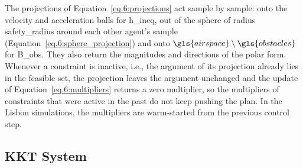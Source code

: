 The projections of Equation~\eqref{eq.6:projections} act sample by sample: onto the velocity and acceleration balls for \gls{h_ineq}, out of the sphere of radius \gls{safety_radius} around each other agent's sample (Equation~\eqref{eq.6:sphere_projection}) and onto $\gls{airspace}\setminus\gls{obstacles}$ for \gls{B_obs}. They also return the magnitudes and directions of the polar form. Whenever a constraint is inactive, i.e., the argument of its projection already lies in the feasible set, the projection leaves the argument unchanged and the update of Equation~\eqref{eq.6:multipliers} returns a zero multiplier, so the multipliers of constraints that were active in the past do not keep pushing the plan. In the Lisbon simulations, the multipliers are warm-started from the previous control step.

\subsection{KKT System}

